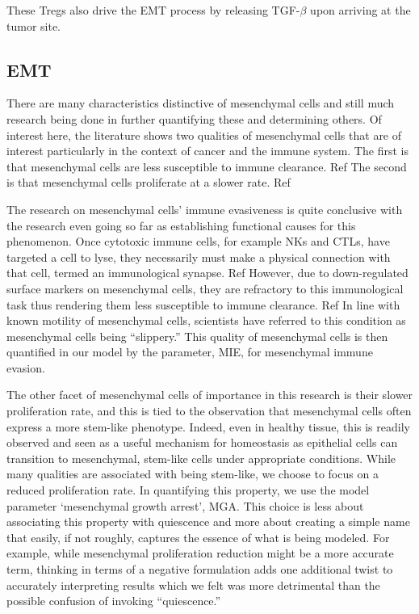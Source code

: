 \documentclass{article}
\begin{document}
These Tregs also drive the EMT process by releasing TGF-$\beta$ upon arriving at the tumor site.

\subsection{EMT}\label{EMT}
There are many characteristics distinctive of mesenchymal cells and still much research being done in further quantifying these and determining others.
Of interest here, the literature shows two qualities of mesenchymal cells that are of interest particularly in the context of cancer and the immune system.
The first is that mesenchymal cells are less susceptible to immune clearance. Ref 
The second is that mesenchymal cells proliferate at a slower rate. Ref

The research on mesenchymal cells' immune evasiveness is quite conclusive with the research even going so far as establishing functional causes for this phenomenon.
Once cytotoxic immune cells, for example NKs and CTLs, have targeted a cell to lyse, they necessarily must make a physical connection with that cell, termed an immunological synapse. Ref 
However, due to down-regulated surface markers on mesenchymal cells, they are refractory to this immunological task thus rendering them less susceptible to immune clearance. Ref
In line with known motility of mesenchymal cells, scientists have referred to this condition as mesenchymal cells being ``slippery.''
This quality of mesenchymal cells is then quantified in our model by the parameter, MIE, for mesenchymal immune evasion.

The other facet of mesenchymal cells of importance in this research is their slower proliferation rate, and this is tied to the observation that mesenchymal cells often express a more stem-like phenotype.
Indeed, even in healthy tissue, this is readily observed and seen as a useful mechanism for homeostasis as epithelial cells can transition to mesenchymal, stem-like cells under appropriate conditions.
While many qualities are associated with being stem-like, we choose to focus on a reduced proliferation rate.
In quantifying this property, we use the model parameter `mesenchymal growth arrest', MGA.
This choice is less about associating this property with quiescence and more about creating a simple name that easily, if not roughly, captures the essence of what is being modeled.
For example, while mesenchymal proliferation reduction might be a more accurate term, thinking in terms of a negative formulation adds one additional twist to accurately interpreting results which we felt was more detrimental than the possible confusion of invoking ``quiescence.''
\end{document}

